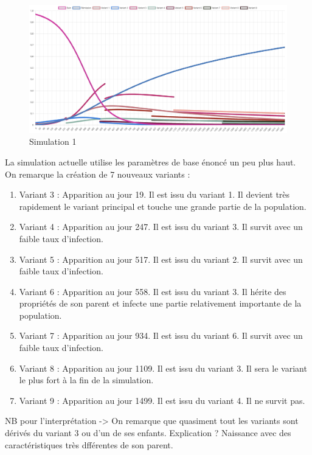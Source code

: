 \documentclass{article}
\begin{document}
\begin{figure}[h]
    \includegraphics[width=\linewidth]{images/Simulation1.png}
    \caption{Simulation 1}
    \label{fig:simulation1}
\end{figure}

\noindent
La simulation actuelle utilise les paramètres de base énoncé un peu plus haut. \\
On remarque la création de 7 nouveaux variants : \\
\begin{enumerate}
    \item Variant 3 : Apparition au jour 19. Il est issu du variant 1. Il devient très rapidement le variant principal et touche une grande partie de la population.
    \item Variant 4 : Apparition au jour 247. Il est issu du variant 3. Il survit avec un faible taux d'infection.
    \item Variant 5 : Apparition au jour 517. Il est issu du variant 2. Il survit avec un faible taux d'infection.
    \item Variant 6 : Apparition au jour 558. Il est issu du variant 3. Il hérite des propriétés de son parent et infecte une partie relativement importante de la population.
    \item Variant 7 : Apparition au jour 934. Il est issu du variant 6. Il survit avec un faible taux d'infection.
    \item Variant 8 : Apparition au jour 1109. Il est issu du variant 3. Il sera le variant le plus fort à la fin de la simulation.
    \item Variant 9 : Apparition au jour 1499. Il est issu du variant 4. Il ne survit pas.
\end{enumerate}

NB pour l'interprétation -> On remarque que quasiment tout les variants sont dérivés du variant 3 ou d'un de ses enfants. Explication ? Naissance avec des caractéristiques très dfférentes de son parent. \\
\end{document}
